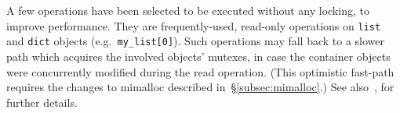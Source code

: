 A few operations have been selected to be executed without any locking, to improve performance.
They are frequently-used, read-only operations on \texttt{list} and \texttt{dict} objects (e.g.\ \texttt{{my\_list[0]}}).
Such operations may fall back to a slower path which acquires the involved objects' mutexes, in case the container objects were concurrently modified during the read operation.
(This optimistic fast-path requires the changes to mimalloc described in~\S\ref{subsec:mimalloc}.)
See also~\cite[\S Optimistically Avoiding Locking]{pep703}, for further details.
